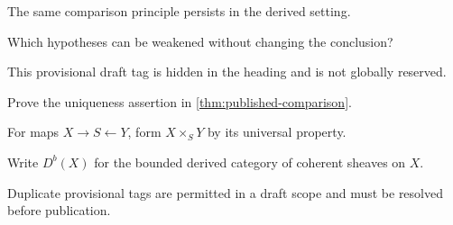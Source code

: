 \documentclass[sectionlevel=book,status=draft]{noteformyself}
\begin{document}
\begin{conjecture}[
  title={A plausible extension},
  label=\labelNFM{conj:book}
]
  The same comparison principle persists in the derived setting.
\end{conjecture}

\begin{question}[label=\labelNFM{ques:book}]
  Which hypotheses can be weakened without changing the conclusion?
\end{question}

\begin{example}[tag=0CDEF01,label=\labelNFM{eg:first-provisional}]
  This provisional draft tag is hidden in the heading and is not globally reserved.
\end{example}

\begin{exercise}[
  title={Check the universal property},
  label=\labelNFM{ex:book}
]
  Prove the uniqueness assertion in \cref{thm:published-comparison}.
\end{exercise}

\begin{construction}[
  title={A fiber product},
  label=\labelNFM{constr:book}
]
  For maps \(X\to S\leftarrow Y\), form \(X\times_S Y\) by its universal
  property.
\end{construction}

\begin{notation}[label=\labelNFM{not:book}]
  Write \(D^b(X)\) for the bounded derived category of coherent sheaves on
  \(X\).
\end{notation}

\begin{remark}[
  tag=0CDEF01,
  label=\labelNFM{rmk:duplicate-provisional}
]
  Duplicate provisional tags are permitted in a draft scope and must be
  resolved before publication.
\end{remark}
\end{document}
